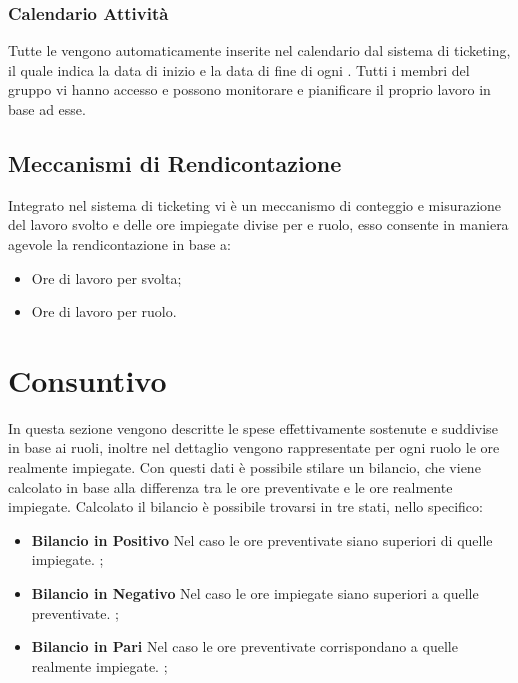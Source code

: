 \documentclass{scalatekids-article}
\begin{document}
\subsubsection{Calendario Attività}
Tutte le  vengono automaticamente inserite nel calendario dal sistema di ticketing, il quale
indica la data di inizio e la data di fine di ogni . Tutti i membri del gruppo vi hanno accesso
e possono monitorare e pianificare il proprio lavoro in base ad esse.
\subsection{Meccanismi di Rendicontazione}
Integrato nel sistema di ticketing vi è un meccanismo di conteggio e misurazione del lavoro svolto
e delle ore impiegate divise per  e ruolo, esso consente in maniera agevole la rendicontazione
in base a:
\begin{itemize}
\item{Ore di lavoro per  svolta;}
\item{Ore di lavoro per ruolo.}
\end{itemize}
\newpage
\section{Consuntivo}
In questa sezione vengono descritte le spese effettivamente sostenute e suddivise in base ai ruoli,
inoltre nel dettaglio vengono rappresentate per ogni ruolo le ore realmente impiegate. Con questi
dati è possibile stilare un bilancio, che viene calcolato in base alla differenza tra le ore preventivate
e le ore realmente impiegate.
Calcolato il bilancio è possibile trovarsi in tre stati, nello specifico:
\begin{itemize}
\item{\textbf{Bilancio in Positivo} Nel caso le ore preventivate siano superiori di quelle impiegate. ;}
\item{\textbf{Bilancio in Negativo} Nel caso le ore impiegate siano superiori a quelle preventivate. ;}
\item{\textbf{Bilancio in Pari} Nel caso le ore preventivate corrispondano a quelle realmente impiegate. ;}
\end{itemize}
\end{document}
